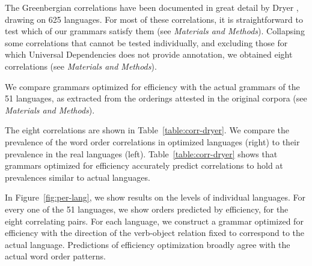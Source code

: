 \documentclass[9pt,twocolumn,twoside,lineno]{pnas-new}
\begin{document}
The Greenbergian correlations have been documented in great detail by Dryer \cite{dryer1992greenbergian}, drawing on 625 languages.
For most of these correlations, it is straightforward to test which of our grammars satisfy them (see \textit{Materials and Methods}).
Collapsing some correlations that cannot be tested individually, and excluding those for which Universal Dependencies does not provide annotation, we obtained eight correlations  (see \textit{Materials and Methods}).

We compare grammars optimized for efficiency with the actual grammars of the 51 languages, as extracted from the orderings attested in the original corpora (see \textit{Materials and Methods}).

The eight correlations are shown in Table~\ref{table:corr-dryer}.
We compare the prevalence of the word order correlations in optimized languages (right) to their prevalence in the real languages (left).
Table~\ref{table:corr-dryer} shows that grammars optimized for efficiency accurately predict correlations to hold at prevalences similar to actual languages.

In Figure~\ref{fig:per-lang}, we show results on the levels of individual languages.
For every one of the 51 languages, we show orders predicted by efficiency, for the eight correlating pairs.
For each language, we construct a grammar optimized for efficiency with the direction of the verb-object relation fixed to correspond to the actual language.
Predictions of efficiency optimization broadly agree with the actual word order patterns.
\end{document}
